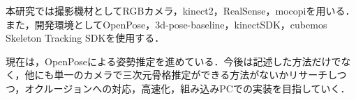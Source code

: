 \documentclass[titlepage]{jarticle}
\begin{document}
%
%
%
%
本研究では撮影機材としてRGBカメラ，kinect2，RealSense，mocopiを用いる．また，開発環境としてOpenPose，3d-pose-baseline，kinectSDK，cubemos Skeleton Tracking SDKを使用する．





%

%
%
%
%
現在は，OpenPoseによる姿勢推定を進めている．今後は記述した方法だけでなく，他にも単一のカメラで三次元骨格推定ができる方法がないかリサーチしつつ，オクルージョンへの対応，高速化，組み込みPCでの実装を目指していく．
%
%
%

%

%
%
%
%

%
%
\end{document}

